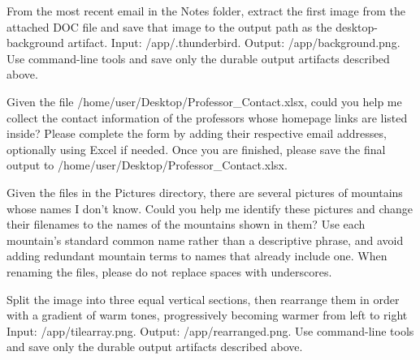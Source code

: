 \documentclass{llmxive}
\begin{document}
\begin{instructionbox}
From the most recent email in the \textasciigrave{}Notes\textasciigrave{} folder, extract the first image from the attached DOC file and save that image to the output path as the desktop-background artifact.
Input: \textasciigrave{}/app/.thunderbird\textasciigrave{}.
Output: \textasciigrave{}/app/background.png\textasciigrave{}.
Use command-line tools and save only the durable output artifacts described above.
\end{instructionbox}

\begin{instructionbox}
Given the file \textasciigrave{}/home/user/Desktop/Professor\_Contact.xlsx\textasciigrave{}, could you help me collect the contact information of the professors whose homepage links are listed inside? Please complete the form by adding their respective email addresses, optionally using Excel if needed. Once you are finished, please save the final output to \textasciigrave{}/home/user/Desktop/Professor\_Contact.xlsx\textasciigrave{}.
\end{instructionbox}

\begin{instructionbox}
Given the files in the Pictures directory, there are several pictures of mountains whose names I don't know. Could you help me identify these pictures and change their filenames to the names of the mountains shown in them? Use each mountain's standard common name rather than a descriptive phrase, and avoid adding redundant mountain terms to names that already include one. When renaming the files, please do not replace spaces with underscores.
\end{instructionbox}

\begin{instructionbox}
Split the image into three equal vertical sections, then rearrange them in order with a gradient of warm tones, progressively becoming warmer from left to right
Input: \textasciigrave{}/app/tilearray.png\textasciigrave{}.
Output: \textasciigrave{}/app/rearranged.png\textasciigrave{}.
Use command-line tools and save only the durable output artifacts described above.
\end{instructionbox}
\end{document}
